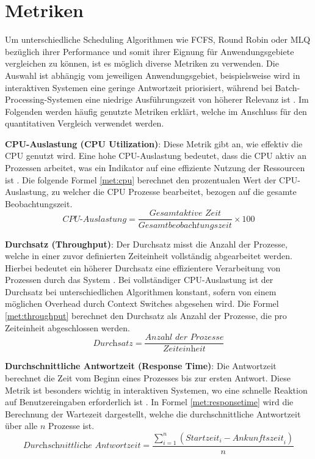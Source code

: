 
\section{Metriken}
Um unterschiedliche Scheduling Algorithmen wie \ac{FCFS}, Round Robin oder \ac{MLQ} bezüglich ihrer Performance und somit ihrer Eignung für Anwendungsgebiete vergleichen zu können, ist es möglich diverse Metriken zu verwenden. Die Auswahl ist abhängig vom jeweiligen Anwendungsgebiet, beispielsweise wird in interaktiven Systemen eine geringe Antwortzeit priorisiert, während bei Batch-Processing-Systemen eine niedrige Ausführungszeit von höherer Relevanz ist \autocite{thombare_efficient_2016}. Im Folgenden werden häufig genutzte Metriken erklärt, welche im Anschluss für den quantitativen Vergleich verwendet werden.


\textbf{\ac{CPU}-Auslastung (\ac{CPU} Utilization)}: Diese Metrik gibt an, wie effektiv die \ac{CPU} genutzt wird. Eine hohe \ac{CPU}-Auslastung bedeutet, dass die \ac{CPU} aktiv an Prozessen arbeitet, was ein Indikator auf eine effiziente Nutzung der Ressourcen ist \autocite{pemasinghe_comparison_2022}. Die folgende Formel \ref{met:cpu} berechnet den prozentualen Wert der \ac{CPU}-Auslastung, zu welcher die \ac{CPU} Prozesse bearbeitet, bezogen auf die gesamte Beobachtungszeit.
\begin{equation}
	\textit{CPU-Auslastung} = \frac{\textit{Gesamtaktive Zeit}}{\textit{Gesamtbeobachtungszeit}} \times 100
	\label{met:cpu}
\end{equation}


\textbf{Durchsatz (Throughput)}: Der Durchsatz misst die Anzahl der Prozesse, welche in einer zuvor definierten Zeiteinheit vollständig abgearbeitet werden. Hierbei bedeutet ein höherer Durchsatz eine effizientere Verarbeitung von Prozessen durch das System  \autocite{pemasinghe_comparison_2022}. Bei vollständiger \ac{CPU}-Auslastung ist der Durchsatz bei unterschiedlichen Algorithmen konstant, sofern von einem möglichen Overhead durch Context Switches abgesehen wird. Die Formel \ref{met:throughput} berechnet den Durchsatz als Anzahl der Prozesse, die pro Zeiteinheit abgeschlossen werden.
\begin{equation}
	\textit{Durchsatz} = \frac{\textit{Anzahl\ der\ Prozesse}}{\textit{Zeiteinheit}}
	\label{met:throughput}
\end{equation}


\textbf{Durchschnittliche Antwortzeit (Response Time)}: Die Antwortzeit berechnet die Zeit vom Beginn eines Prozesses bis zur ersten Antwort. Diese Metrik ist besonders wichtig in interaktiven Systemen, wo eine schnelle Reaktion auf Benutzereingaben erforderlich ist  \autocite{pemasinghe_comparison_2022}. In Formel \ref{met:responsetime} wird die Berechnung der Wartezeit dargestellt, welche die durchschnittliche Antwortzeit über alle \( n \) Prozesse ist.
\begin{equation}
	\textit{Durchschnittliche Antwortzeit} = \frac{\sum_{i=1}^{n} (\textit{Startzeit}_{i} - \textit{Ankunftszeit}_{i})}{n}
	\label{met:responsetime}
\end{equation}


